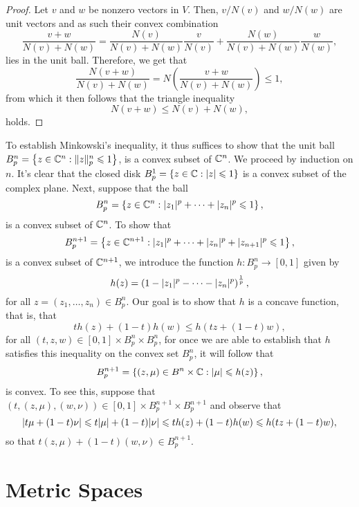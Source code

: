 \begin{proof}
  Let \(v\) and \(w\) be nonzero vectors in \(V\). Then, \(v/N(v)\) and
  \(w/N(w)\) are unit vectors and as such their convex combination
  \[
    \frac{v+w}{N(v)+N(w)}
    =
    \frac{N(v)}{N(v)+N(w)}\frac{v}{N(v)}
    +
    \frac{N(w)}{N(v)+N(w)}\frac{w}{N(w)}
    ,
  \]
  lies in the unit ball. Therefore, we get that
  \[
    \frac{N(v+w)}{N(v)+N(w)}
    =
    N\left(\frac{v+w}{N(v)+N(w)}\right)\leqslant{1},
  \]
  from which it then follows that the triangle inequality
  \[
    N(v+w)\leqslant{N(v)+N(w)},
  \]
  holds.
\end{proof}

To establish Minkowski's inequality, it thus suffices to show that the unit
ball
\(B^{n}_{p}=\left\{z\in\complexfield^{n}:\norm<n>(p)[z]\leqslant{1}\right\}\),
is a convex subset of \(\mathbb{C}^{n}\). We proceed by induction on \(n\).
It's clear that the closed disk
\(B^{1}_{p}=\left\{z\in\mathbb{C}:\lvert z\rvert\leqslant{1}\right\}\) is a convex
subset of the complex plane. Next, suppose that the ball
\[
  B^{n}_{p}
  =
  \left\{z\in\mathbb{C}^{n}:\lvert z_{1}\rvert^{p}+\cdots+\lvert z_{n}\rvert^{p}\leqslant{1}\right\},
\]
is a convex subset of \(\mathbb{C}^{n}\). To show that
\[
  B^{n+1}_{p}
  =
  \left\{z\in\mathbb{C}^{n+1}:\lvert z_{1}\rvert^{p}+\cdots+\lvert z_{n}\rvert^{p}+\lvert z_{n+1}\rvert^{p}\leqslant{1}\right\},
\]
is a convex subset of \(\mathbb{C}^{n+1}\), we introduce the function
\(h:B^{n}_{p}\to[0,1]\) given by
\[
	h(z)=\left(1-\lvert z_{1}\rvert^{p}-\cdots-\lvert z_{n}\rvert^{p}\right)^{\frac{1}{p}},
\]
for all \(z=(z_{1},\ldots,z_{n})\in{B^{n}_{p}}\). Our goal is to show that \(h\) is a concave function, that is, that
\[
	th(z)+(1-t)h(w)\leqslant{h(tz+(1-t)w)},
\]
for all \((t,z,w)\in{[0,1]\times{B^{n}_{p}}\times{B^{n}_{p}}}\), for once we
are able to establish that \(h\) satisfies this inequality on the convex set
\(B^{n}_{p}\), it will follow that
\[
	B^{n+1}_{p}
  =
  \left\{(z,\mu)\in{B^{n}\times\mathbb{C}}:\lvert\mu\rvert\leqslant{h(z)}\right\},
\]
is convex. To see this, suppose that
\((t,(z,\mu),(w,\nu))\in{[0,1]\times{B^{n+1}_{p}}\times{B^{n+1}_{p}}}\) and
observe that
\[
	\lvert t\mu+(1-t)\nu\rvert
  \leqslant{t\lvert\mu\rvert+(1-t)\lvert\nu\rvert}
  \leqslant{th(z)+(1-t)h(w)}
  \leqslant{h(tz+(1-t)w}),
\]
so that \(t(z,\mu)+(1-t)(w,\nu)\in{B^{n+1}_{p}}\).

\section{Metric Spaces}\label{sec:metric-spaces}

